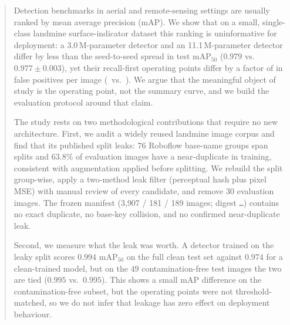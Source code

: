 \begin{abstract}
Detection benchmarks in aerial and remote-sensing settings are usually ranked by
mean average precision (mAP). We show that on a small, single-class landmine
surface-indicator dataset this ranking is uninformative for deployment: a
3.0\,M-parameter detector and an 11.1\,M-parameter detector differ by less than
the seed-to-seed spread in test mAP$_{50}$ ($0.979$ vs.\ $0.977 \pm 0.003$), yet their
recall-first operating points differ by a factor of \fpct{} in false positives
per image (\fpn\ vs.\ \fps). We argue that the meaningful object of study is the
operating point, not the summary curve, and we build the evaluation protocol
around that claim.

The study rests on two methodological contributions that require no new
architecture. First, we audit a widely reused landmine image corpus and find that
its published split leaks: $76$ Roboflow base-name groups span splits and
$63.8\%$ of evaluation images have a near-duplicate in training, consistent with
augmentation applied before splitting. We rebuild the split group-wise, apply a
two-method leak filter (perceptual hash plus pixel MSE) with manual review of
every candidate, and remove $30$ evaluation images. The frozen manifest
(3{,}907 / 181 / 189 images; digest \texttt{\manifestsum\ldots}) contains no
exact duplicate, no base-key collision, and no confirmed near-duplicate leak.

Second, we measure what the leak was worth. A detector trained on the leaky split
scores $0.994$ mAP$_{50}$ on the full clean test set against $0.974$ for a
clean-trained model, but on the $49$ contamination-free test images the two are
tied ($0.995$ vs.\ $0.995$). This shows a small mAP difference on the
contamination-free subset, but the operating points were not threshold-matched,
so we do not infer that leakage has zero effect on deployment behaviour.


\end{abstract}
